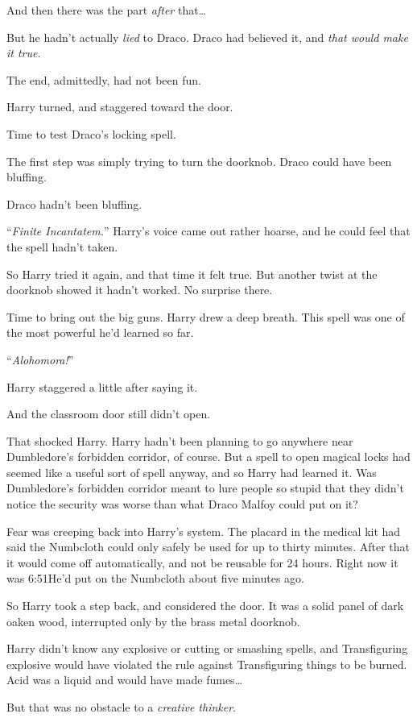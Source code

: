 And then there was the part \emph{after} that…

But he hadn’t actually \emph{lied} to Draco. Draco had believed it, and \emph{that would make it true}.

The end, admittedly, had not been fun.

Harry turned, and staggered toward the door.

Time to test Draco’s locking spell.

The first step was simply trying to turn the doorknob. Draco could have been bluffing.

Draco hadn’t been bluffing.

“\emph{Finite Incantatem.}” Harry’s voice came out rather hoarse, and he could feel that the spell hadn’t taken.

So Harry tried it again, and that time it felt true. But another twist at the doorknob showed it hadn’t worked. No surprise there.

Time to bring out the big guns. Harry drew a deep breath. This spell was one of the most powerful he’d learned so far.

“\emph{Alohomora!}”

Harry staggered a little after saying it.

And the classroom door still didn’t open.

That shocked Harry. Harry hadn’t been planning to go anywhere near Dumbledore’s forbidden corridor, of course. But a spell to open magical locks had seemed like a useful sort of spell anyway, and so Harry had learned it. Was Dumbledore’s forbidden corridor meant to lure people so stupid that they didn’t notice the security was worse than what Draco Malfoy could put on it?

Fear was creeping back into Harry’s system. The placard in the medical kit had said the Numbcloth could only safely be used for up to thirty minutes. After that it would come off automatically, and not be reusable for 24 hours. Right now it was 6:51\pm He’d put on the Numbcloth about five minutes ago.

So Harry took a step back, and considered the door. It was a solid panel of dark oaken wood, interrupted only by the brass metal doorknob.

Harry didn’t know any explosive or cutting or smashing spells, and Transfiguring explosive would have violated the rule against Transfiguring things to be burned. Acid was a liquid and would have made fumes…

But that was no obstacle to a \emph{creative thinker}.

